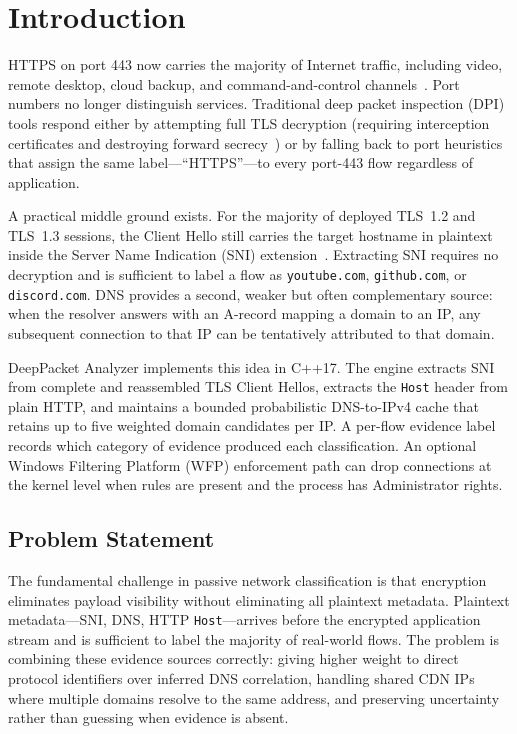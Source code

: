 \documentclass[conference]{IEEEtran}
\begin{document}
\section{Introduction}

HTTPS on port 443 now carries the majority of Internet traffic,
including video, remote desktop, cloud backup, and command-and-control
channels~\cite{rfc9000}. Port numbers no longer distinguish services.
Traditional deep packet inspection (DPI) tools respond either by
attempting full TLS decryption (requiring interception certificates and
destroying forward secrecy~\cite{tls13}) or by falling back to port
heuristics that assign the same label---``HTTPS''---to every
port-443 flow regardless of application.

A practical middle ground exists. For the majority of deployed TLS~1.2
and TLS~1.3 sessions, the Client Hello still carries the target
hostname in plaintext inside the Server Name Indication (SNI)
extension~\cite{sni}. Extracting SNI requires no decryption and is
sufficient to label a flow as \texttt{youtube.com}, \texttt{github.com},
or \texttt{discord.com}. DNS provides a second, weaker but often
complementary source: when the resolver answers with an A-record
mapping a domain to an IP, any subsequent connection to that IP can be
tentatively attributed to that domain.

DeepPacket Analyzer implements this idea in C++17.
The engine extracts SNI from complete and reassembled TLS Client Hellos,
extracts the \texttt{Host} header from plain HTTP, and maintains a
bounded probabilistic DNS-to-IPv4 cache that retains up to five
weighted domain candidates per IP.  A per-flow evidence label records
which category of evidence produced each classification.
An optional Windows Filtering Platform (WFP) enforcement path can drop
connections at the kernel level when rules are present and the process
has Administrator rights.

\subsection{Problem Statement}

The fundamental challenge in passive network classification is that
encryption eliminates payload visibility without eliminating all
plaintext metadata. Plaintext metadata---SNI, DNS, HTTP
\texttt{Host}---arrives before the encrypted application stream and
is sufficient to label the majority of real-world flows.
The problem is combining these evidence sources correctly:
giving higher weight to direct protocol identifiers over inferred
DNS correlation, handling shared CDN IPs where multiple domains
resolve to the same address, and preserving uncertainty rather than
guessing when evidence is absent.
\end{document}
